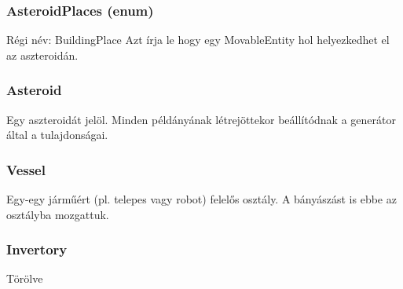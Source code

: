 \documentclass[../../projlab]{subfiles}
\begin{document}
\subsubsection{AsteroidPlaces (enum)}
\begin{class-template-responsibility}
    Régi név: BuildingPlace
    Azt írja le hogy egy MovableEntity hol helyezkedhet el az aszteroidán.
\end{class-template-responsibility}
\begin{class-template-attribute}
\end{class-template-attribute}

\subsubsection{Asteroid}
\begin{class-template-responsibility}
    Egy aszteroidát jelöl. Minden példányának létrejöttekor beállítódnak a generátor által a tulajdonságai.
\end{class-template-responsibility}
\begin{class-template-attribute}
\end{class-template-attribute}


\subsubsection{Vessel}
\begin{class-template-responsibility}
    Egy-egy járműért (pl. telepes vagy robot) felelős osztály. 
    A bányászást is ebbe az osztályba mozgattuk.
\end{class-template-responsibility}
\begin{class-template-method}
\end{class-template-method}


\subsubsection{Invertory}
\begin{class-template-responsibility}
    Törölve
\end{class-template-responsibility}
\end{document}
